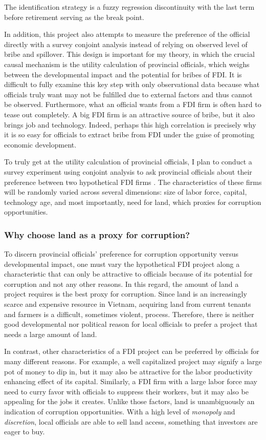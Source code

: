 The identification strategy is a fuzzy regression discontinuity with the last term before retirement serving as the break point.

In addition, this project also attempts to measure the preference of the official directly with a survey conjoint analysis instead of relying on observed level of bribe and spillover. This design is important for my theory, in which the crucial causal mechanism is the utility calculation of provincial officials, which weighs between the developmental impact and the potential for bribes of FDI. It is difficult to fully examine this key step with only observational data because what officials truly want may not be fulfilled due to external factors and thus cannot be observed. Furthermore, what an official wants from a FDI firm is often hard to tease out completely. A big FDI firm is an attractive source of bribe, but it also brings job and technology. Indeed, perhaps this high correlation is precisely why it is so easy for officials to extract bribe from FDI under the guise of promoting economic development.

To truly get at the utility calculation of provincial officials, I plan to conduct a survey experiment using conjoint analysis to ask provincial officials about their preference between two hypothetical FDI firms \citep{Hainmueller2014}. The characteristics of these firms will be randomly varied across several dimensions: size of labor force, capital, technology age, and most importantly, need for land, which proxies for corruption opportunities.

\subsubsection{Why choose land as a proxy for corruption?}

To discern provincial officials' preference for corruption opportunity versus developmental impact, one must vary the hypothetical FDI project along a characteristic that can only be attractive to officials because of its potential for corruption and not any other reasons. In this regard, the amount of land a project requires is the best proxy for corruption. Since land is an increasingly scarce and expensive resource in Vietnam, acquiring land from current tenants and farmers is a difficult, sometimes violent, process. Therefore, there is neither good developmental nor political reason for local officials to prefer a project that needs a large amount of land. 

In contrast, other characteristics of a FDI project can be preferred by officials for many different reasons. For example, a well capitalized project may signify a large pot of money to dip in, but it may also be attractive for the labor productivity enhancing effect of its capital. Similarly, a FDI firm with a large labor force may need to curry favor with officials to suppress their workers, but it may also be appealing for the jobs it creates.  Unlike those factors, land is unambiguously an indication of corruption opportunities. With a high level of \textit{monopoly} and \textit{discretion}, local officials are able to sell land access, something that investors are eager to buy.

